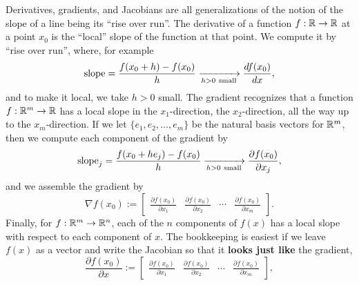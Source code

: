 \begin{tcolorbox}[sharp corners, colback=green!30, colframe=green!80!blue,title={\textbf{From slopes of lines}$\to$\textbf{slopes of functions at points}~$\mathbf{\to \frac{df(x_0)}{dx} \to \nabla f(x_0) \to \frac{\partial f(x_0)}{\partial x}}$}]
Derivatives, gradients, and Jacobians are all generalizations of the notion of the slope  of a line being its ``rise over run''. The derivative of a function $f:\mathbb R \to \mathbb R$ at a point $x_0$ is the ``local'' slope of the function at that point. We compute it by ``rise over run'', where, for example
\begin{equation}
    \label{eq:optional:SummaryDerivative}
 \text{\rm slope} = \frac{f(x_0+h)-f(x_0)}{h} \xrightarrow[h>0~\text{small}]{} \frac{df(x_0)}{dx},
\end{equation}
and to make it local, we take $h>0$ small. The gradient recognizes that a function $f:\mathbb R^m \to \mathbb R$ has a local slope in the $x_1$-direction, the $x_2$-direction, all the way up to the $x_m$-direction. If we let $\{e_1, e_2, \ldots, e_m \}$ be the natural basis vectors for $\mathbb R^m$, then we compute each component of the gradient by 
\begin{equation}
    \label{eq:optional:SummaryGradient01}
    \text{\rm slope}_j = \frac{f(x_0+h e_j)-f(x_0)}{h}  \xrightarrow[h>0~\text{small}]{} \frac{\partial f(x_0)}{\partial x_j}, 
    \end{equation}
and we assemble the gradient by 
\begin{equation}
    \label{eq:optional:SummaryGradient02}
\nabla f(x_0):= \left[\begin{array}{cccc} \frac{\partial f(x_0)}{\partial x_1} & \frac{\partial f(x_0)}{\partial x_2} & \cdots & \frac{\partial f(x_0)}{\partial x_m}
\end{array} \right]. 
\end{equation}
Finally, for $f:\mathbb R^m \to \mathbb R^n$, each of the $n$ components of $f(x)$ has a local slope with respect to each component of $x$. The bookkeeping is easiest if we leave $f(x)$ as a vector and write the Jacobian so that it \textbf{looks just like} the gradient,  
\begin{equation}
    \label{eq:optional:SummaryJacobian01}
    \frac{ \partial f(x_0) }{\partial x}:= \left[\begin{array}{cccc} \frac{\partial f(x_0)}{\partial x_1} & \frac{\partial f(x_0)}{\partial x_2} & \cdots & \frac{\partial f(x_0)}{\partial x_m}
\end{array} \right],  
\end{equation}

\end{tcolorbox}
